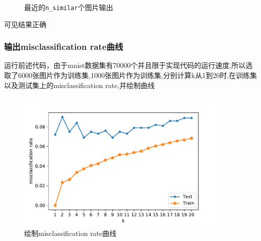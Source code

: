 \documentclass[UTF8]{ctexart}
\begin{document}
\begin{figure}[h]
    
    \caption{最近的\lstinline{n_similar}个图片输出}
\end{figure}
可见结果正确

\newpage
\subsubsection{输出misclassification rate曲线}
运行前述代码，由于mnist数据集有70000个并且限于实现代码的运行速度,所以选取了6000张图片作为训练集,1000张图片作为训练集,分别计算k从1到20时,在训练集
以及测试集上的misclassification rate,并绘制曲线
\begin{figure}[h]
    \centering
    \includegraphics[width=4in]{asset/misclassification.pdf}
    \caption{绘制misclassification rate曲线} %
\end{figure}
\end{document}
